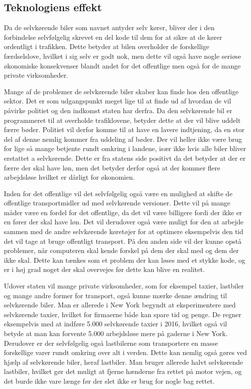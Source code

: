 \subsection{Teknologiens effekt}
Da de selvkørende biler som navnet antyder selv kører, bliver der i den forbindelse selvfølgelig skrevet en del kode til dem for at sikre at de kører ordentligt i trafikken. Dette betyder at bilen overholder de forskellige færdselslove, hvilket i sig selv er godt nok, men dette vil også have nogle seriøse økonomiske konsekvenser blandt andet for det offentlige men også for de mange private virksomheder. 

Mange af de problemer de selvkørende biler skaber kan finde hos den offentlige sektor. Det er som udgangspunkt meget lige til at finde ud af hvordan de vil påvirke politiet og den indkomst staten har derfra. Da den selvkørende bil er programmeret til at overholde trafiklovene, betyder dette at der vil blive uddelt færre bøder. Politiet vil derfor komme til at have en lavere indtjening, da en stor del af denne nemlig kommer fra uddeling af bøder\cite{B}. Der vil heller ikke være brug for lige så mange betjente rundt omkring i landene, især ikke hvis alle biler bliver erstattet a selvkørende. Dette er fra statens side positivt da det betyder at der er færre der skal have løn, men det betyder derfor også at der kommer flere arbejdsløse hvilket er dårligt for økonomien.

Inden for det offentlige vil det selvfølgelig også være en mulighed at skifte de offentlige transportmidler ud med selvkørende versioner. Dette vil på mange måder være en fordel for det offentlige, da det vil være billigere fordi der ikke er en fører der skal have løn. Det vil derudover også være muligt for den at arbejde sammen med de andre selvkørende køretøjer for at optimere eksempelvis den tid det vil tage at bruge offentligt transport. På den anden side vil der kunne opstå problemer, når computeren skal kende forskel på dem der skal med og dem der ikke skal. Dette kan tænkes som et problem der kan løses med et stykke kode, og er i høj grad noget der skal overvejes før dette kan blive en realitet\cite{BUS}.

Udover staten vil mange private virksomheder, som for eksempel taxier, lastbiler og mange andre former for transport, også kunne mærke denne ændring til selvkørende biler. Man er allerede i New York begyndt at eksperimentere med selvkørende taxier, hvilket for firmaerne både kan spare tid og penge. De regner eksempelvis med at indføre 5.000 selvkørende taxier i 2016, hvilket også vil betyde at man kan forvente 5.000 arbejdsløse mere på gaderne i New York\cite{TAXI}. Derudover er der selvfølgelig også lastbilerne som transportere en masse forskellige varer rundt omkring over alt i verden. Dette kan nemlig også gøres ved hjælp af selvkørende biler, heraf lastbiler. Man bruger allerede halvt selvkørende lastbiler, hvilket gør det muligt at fjerne hænderne fra rettet på motor vejen, og det burde ikke vare længe før der slet ikke er brug for nogle bag rettet\cite{TRUCKS}.

